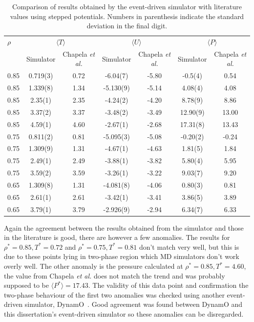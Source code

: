 \documentclass[12pt]{UoAthesis} \usepackage{booktabs}
\begin{document}
\begin{table} [htp]
  \caption[Event-driven simulation stepped potential benchmarking results]
  {Comparison of results
    obtained by the event-driven simulator with literature values
    using stepped potentials. Numbers in parenthesis indicate the
    standard deviation in the final digit.
    \label{tab:benchsoft}} 
  \begin{center} 
    \begin{tabular}{l c c c c c c} 
      \toprule
      $\rho$ & \multicolumn{2}{c}{$\langle T\rangle$} &
      \multicolumn{2}{c}{$\langle U \rangle$} &
      \multicolumn{2}{c}{$\langle P \rangle$}
      \\ \cmidrule(rl{0.75em}){2-3} \cmidrule(rl{0.75em}){4-5}
      \cmidrule(rl{0.75em}){6-7}& Simulator & Chapela \textit{et al.} &
      Simulator & Chapela \textit{et al.} & Simulator & Chapela \textit{et al.}\\ 
      \midrule
      0.85 & 0.719(3) & 0.72 & -6.04(7) & -5.80 & -0.5(4) & 0.54
      \\ 0.85& 1.339(8) & 1.34 & -5.130(9) & -5.14 & 4.08(4) & 4.08
      \\ 0.85 & 2.35(1) & 2.35 & -4.24(2) & -4.20 & 8.78(9) & 8.86
      \\ 0.85 & 3.37(2) & 3.37 & -3.48(2) & -3.49 & 12.90(9) & 13.00
      \\ 0.85 & 4.59(1) & 4.60 & -2.67(1) & -2.68 & 17.31(8) & 13.43
      \\ 0.75 & 0.811(2) & 0.81 & -5.095(3) & -5.08 & -0.20(2) & -0.24
      \\ 0.75 &1.309(9) & 1.31 & -4.67(1) & -4.63 & 1.81(5) & 1.84
      \\ 0.75 & 2.49(1) & 2.49 & -3.88(1) & -3.82 & 5.80(4) & 5.95
      \\ 0.75 & 3.59(2) & 3.59 & -3.26(1) & -3.22 & 9.03(7) & 9.20
      \\ 0.65 & 1.309(8) & 1.31 & -4.081(8) & -4.06 & 0.80(3) & 0.81
      \\0.65 & 2.61(1) & 2.61 & -3.42(1) & -3.41 & 3.86(5) & 3.89
      \\ 0.65 & 3.79(1) & 3.79 & -2.926(9) & -2.94 & 6.34(7) & 6.33
      \\ 
      \bottomrule 
    \end{tabular}
  \end{center} 
\end{table} 

Again the agreement between the results obtained from the simulator
and those in the literature is good, there are however a few
anomalies.  The results for $\rho^* = 0.85, T^*= 0.72$ and $\rho^* =
0.75, T^*= 0.81$ don't match very well, but this is due to these
points lying in two-phase region which MD simulators don't work overly
well.  The other anomaly is the pressure calculated at $\rho^* = 0.85,
T^*= 4.60$, the value from Chapela \textit{et al.} does not match the
trend and was probably supposed to be $\langle P^* \rangle = 17.43$.
The validity of this data point and confirmation the two-phase
behaviour of the first two anomalies was checked using another
event-driven simulator, DynamO~\cite{Bannerman2011}.  Good agreement
was found between DynamO and this dissertation's event-driven
simulator so these anomalies can be disregarded.
\end{document}
